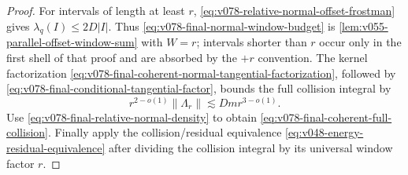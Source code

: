 \documentclass[10pt]{article}
\begin{document}
\begin{proof}
For intervals of length at least \(r\),
\eqref{eq:v078-relative-normal-offset-frostman} gives
\(\lambda_q(I)\le 2D|I|\).  Thus
\eqref{eq:v078-final-normal-window-budget} is
\cref{lem:v055-parallel-offset-window-sum} with \(W=r\); intervals shorter than \(r\) occur only
in the first shell of that proof and are absorbed by the \(+r\) convention.  The kernel factorization
\eqref{eq:v078-final-coherent-normal-tangential-factorization}, followed by
\eqref{eq:v078-final-conditional-tangential-factor}, bounds the full collision integral by
\[
r^{2-o(1)}\|\Lambda_r\|
\lesssim
Dmr^{3-o(1)}.
\]
Use \eqref{eq:v078-final-relative-normal-density} to obtain
\eqref{eq:v078-final-coherent-full-collision}.  Finally apply the collision/residual equivalence
\eqref{eq:v048-energy-residual-equivalence} after dividing the collision integral by its universal
window factor \(r\).
\end{proof}
\end{document}
